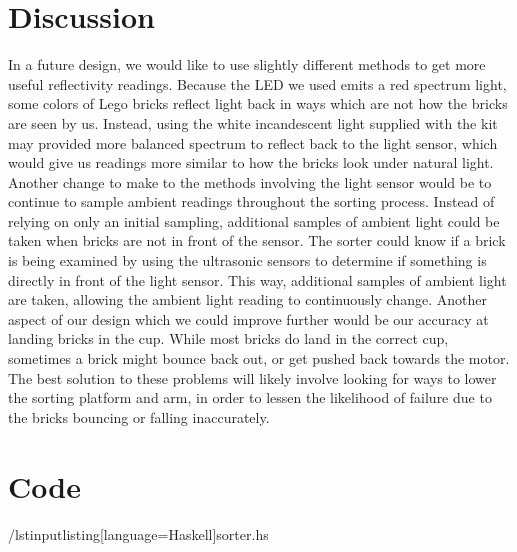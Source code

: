 \documentclass{article}
\begin{document}
\section{Discussion}
In a future design, we would like to use slightly different methods to get more useful reflectivity readings. 
Because the LED we used emits a red spectrum light, some colors of Lego bricks reflect light back in ways which are not how the bricks are seen by us. 
Instead, using the white incandescent light supplied with the kit may provided more balanced spectrum to reflect back to the light sensor, which would give us readings more similar to how the bricks look under natural light. 
Another change to make to the methods involving the light sensor would be to continue to sample ambient readings throughout the sorting process. 
Instead of relying on only an initial sampling, additional samples of ambient light could be taken when bricks are not in front of the sensor. 
The sorter could know if a brick is being examined by using the ultrasonic sensors to determine if something is directly in front of the light sensor. 
This way, additional samples of ambient light are taken, allowing the ambient light reading to continuously change.
Another aspect of our design which we could improve further would be our accuracy at landing bricks in the cup. 
While most bricks do land in the correct cup, sometimes a brick might bounce back out, or get pushed back towards the motor. 
The best solution to these problems will likely involve looking for ways to lower the sorting platform and arm, in order to lessen the likelihood of failure due to the bricks bouncing or falling inaccurately.  

\newpage
\appendix
\section{Code}

/lstinputlisting[language=Haskell]{sorter.hs}
\end{document}
